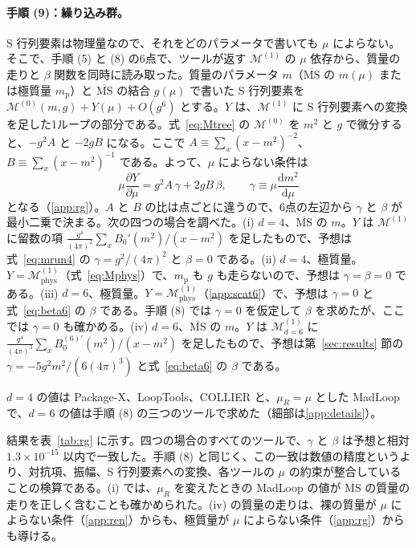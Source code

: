 \documentclass[a4paper,10pt]{ltjsarticle}
\newcommand{\dd}{\mathrm{d}}
\begin{document}
\paragraph{手順 (9)：繰り込み群。}S 行列要素は物理量なので、それをどのパラメータで書いても $\mu$ によらない。そこで、手順 (5) と (8) の6点で、ツールが返す $\mathcal{M}^{(1)}$ の $\mu$ 依存から、質量の走りと $\beta$ 関数を同時に読み取った。質量のパラメータ $m$（$\overline{\mathrm{MS}}$ の $m(\mu)$ または極質量 $m_{\mathrm p}$）と $\overline{\mathrm{MS}}$ の結合 $g(\mu)$ で書いた S 行列要素を $\mathcal{M}^{(0)}(m,g)+Y(\mu)+O(g^6)$ とする。$Y$ は、$\mathcal{M}^{(1)}$ に S 行列要素への変換を足した1ループの部分である。式~\eqref{eq:Mtree} の $\mathcal{M}^{(0)}$ を $m^2$ と $g$ で微分すると、$-g^2A$ と $-2gB$ になる。ここで $A\equiv\sum_x(x-m^2)^{-2}$、$B\equiv\sum_x(x-m^2)^{-1}$ である。よって、$\mu$ によらない条件は
\begin{equation}
\mu\frac{\partial Y}{\partial\mu}=g^2A\,\gamma+2gB\,\beta,\qquad\gamma\equiv\mu\frac{\dd m^2}{\dd\mu}
\label{eq:rgfit}
\end{equation}
となる（\ref{app:rg}）。$A$ と $B$ の比は点ごとに違うので、6点の左辺から $\gamma$ と $\beta$ が最小二乗で決まる。次の四つの場合を調べた。(i) $d=4$、$\overline{\mathrm{MS}}$ の $m$。$Y$ は $\mathcal{M}^{(1)}$ に留数の項 $\frac{g^4}{(4\pi)^2}\sum_xB_0'(m^2)/(x-m^2)$ を足したもので、予想は式~\eqref{eq:mrun4} の $\gamma=g^2/(4\pi)^2$ と $\beta=0$ である。(ii) $d=4$、極質量。$Y=\mathcal{M}^{(1)}_{\mathrm{phys}}$（式~\eqref{eq:Mphys}）で、$m_{\mathrm p}$ も $g$ も走らないので、予想は $\gamma=\beta=0$ である。(iii) $d=6$、極質量。$Y=\mathcal{M}^{(1)}_{\mathrm{phys}}$（\ref{app:scat6}）で、予想は $\gamma=0$ と式~\eqref{eq:beta6} の $\beta$ である。手順 (8) では $\gamma=0$ を仮定して $\beta$ を求めたが、ここでは $\gamma=0$ も確かめる。(iv) $d=6$、$\overline{\mathrm{MS}}$ の $m$。$Y$ は $\mathcal{M}^{(1)}_{d=6}$ に $\frac{g^4}{(4\pi)^3}\sum_xB_0^{(6)\prime}(m^2)/(x-m^2)$ を足したもので、予想は第~\ref{sec:results} 節の $\gamma=-5g^2m^2/(6(4\pi)^3)$ と式~\eqref{eq:beta6} の $\beta$ である。

$d=4$ の値は Package-X、LoopTools、COLLIER と、$\mu_R=\mu$ とした MadLoop で、$d=6$ の値は手順 (8) の三つのツールで求めた（細部は\ref{app:details}）。

結果を表~\ref{tab:rg} に示す。四つの場合のすべてのツールで、$\gamma$ と $\beta$ は予想と相対 $1.3\times10^{-15}$ 以内で一致した。手順 (8) と同じく、この一致は数値の精度というより、対抗項、振幅、S 行列要素への変換、各ツールの $\mu$ の約束が整合していることの検算である。(i) では、$\mu_R$ を変えたときの MadLoop の値が $\overline{\mathrm{MS}}$ の質量の走りを正しく含むことも確かめられた。(iv) の質量の走りは、裸の質量が $\mu$ によらない条件（\ref{app:ren}）からも、極質量が $\mu$ によらない条件（\ref{app:rg}）からも導ける。
\end{document}
